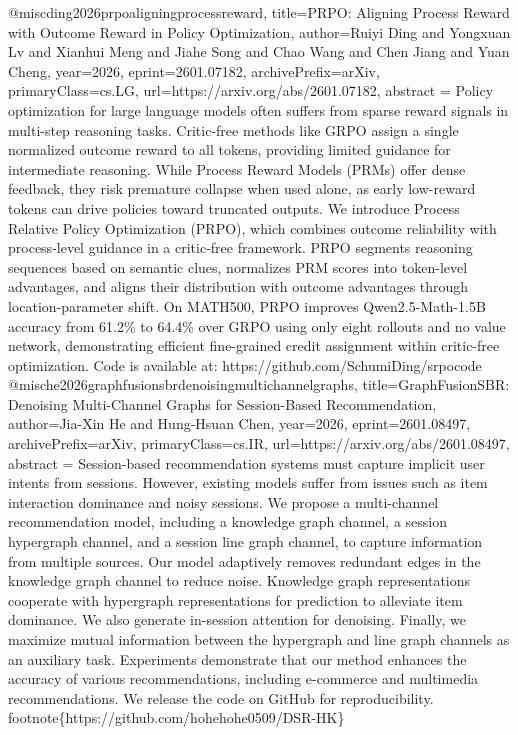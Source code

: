{}@misc{ding2026prpoaligningprocessreward,
      title={PRPO: Aligning Process Reward with Outcome Reward in Policy Optimization}, 
      author={Ruiyi Ding and Yongxuan Lv and Xianhui Meng and Jiahe Song and Chao Wang and Chen Jiang and Yuan Cheng},
      year={2026},
      eprint={2601.07182},
      archivePrefix={arXiv},
      primaryClass={cs.LG},
      url={https://arxiv.org/abs/2601.07182},
      abstract = {Policy optimization for large language models often suffers from sparse reward signals in multi-step reasoning tasks. Critic-free methods like GRPO assign a single normalized outcome reward to all tokens, providing limited guidance for intermediate reasoning. While Process Reward Models (PRMs) offer dense feedback, they risk premature collapse when used alone, as early low-reward tokens can drive policies toward truncated outputs. We introduce Process Relative Policy Optimization (PRPO), which combines outcome reliability with process-level guidance in a critic-free framework. PRPO segments reasoning sequences based on semantic clues, normalizes PRM scores into token-level advantages, and aligns their distribution with outcome advantages through location-parameter shift. On MATH500, PRPO improves Qwen2.5-Math-1.5B accuracy from 61.2\% to 64.4\% over GRPO using only eight rollouts and no value network, demonstrating efficient fine-grained credit assignment within critic-free optimization. Code is available at: https://github.com/SchumiDing/srpocode}
}@misc{he2026graphfusionsbrdenoisingmultichannelgraphs,
      title={GraphFusionSBR: Denoising Multi-Channel Graphs for Session-Based Recommendation}, 
      author={Jia-Xin He and Hung-Hsuan Chen},
      year={2026},
      eprint={2601.08497},
      archivePrefix={arXiv},
      primaryClass={cs.IR},
      url={https://arxiv.org/abs/2601.08497},
      abstract = {Session-based recommendation systems must capture implicit user intents from sessions. However, existing models suffer from issues such as item interaction dominance and noisy sessions. We propose a multi-channel recommendation model, including a knowledge graph channel, a session hypergraph channel, and a session line graph channel, to capture information from multiple sources. Our model adaptively removes redundant edges in the knowledge graph channel to reduce noise. Knowledge graph representations cooperate with hypergraph representations for prediction to alleviate item dominance. We also generate in-session attention for denoising. Finally, we maximize mutual information between the hypergraph and line graph channels as an auxiliary task. Experiments demonstrate that our method enhances the accuracy of various recommendations, including e-commerce and multimedia recommendations. We release the code on GitHub for reproducibility.\\footnote\{https://github.com/hohehohe0509/DSR-HK\}}
}
